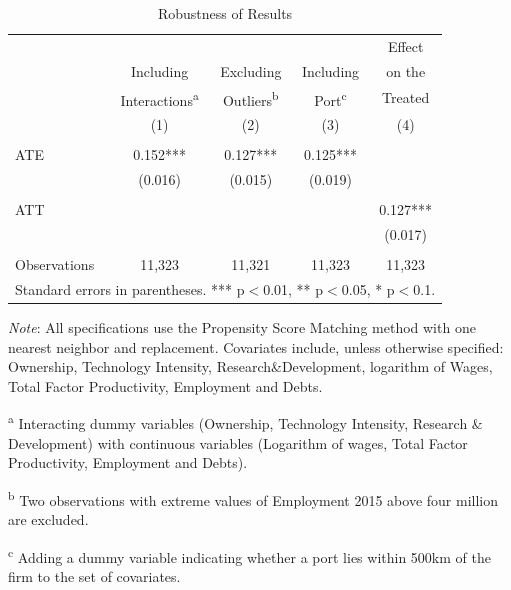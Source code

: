 \documentclass[a4paper,11pt]{scrartcl}
\begin{document}
\begin{table}[h]
  \centering
   \caption{Robustness of Results}
   \label{tab:robust}
\begin{threeparttable}
 
\begin{tabular}{lcccc} 
	\hline 
	\hline
 		& & & & Effect \\
 		& Including & Excluding & Including & on the\\
 		& Interactions\textsuperscript{a} & Outliers\textsuperscript{b} 
 		& Port\textsuperscript{c} & Treated \\
 		& (1) & (2) & (3) & (4) \\ 
 	\hline
 		&  &  &  &  \\
ATE 	& 0.152*** & 0.127*** & 0.125*** &  \\
 		& (0.016) & (0.015) & (0.019) &  \\
 		&  &  &  &  \\
ATT 	&  &  &  & 0.127*** \\
 		&  &  &  & (0.017) \\
 		&  &  &  &  \\
Observations & 11,323 & 11,321 & 11,323 & 11,323 \\ 
	\hline
	\hline
	\multicolumn{5}{c}{\footnotesize{Standard errors in parentheses. *** p$<$0.01, ** p$<$0.05, * p$<$0.1. }}
\end{tabular}

\begin{tablenotes}[flushleft]
     \footnotesize  
     
\item \textit{Note}: All specifications use the Propensity Score Matching method with one nearest neighbor and replacement. Covariates include, unless otherwise specified: Ownership, Technology Intensity, Research\&Development, logarithm of Wages, Total Factor Productivity, Employment and Debts. 

\item\textsuperscript{a} Interacting dummy variables (Ownership, Technology Intensity, Research \& Development) with continuous variables (Logarithm of wages, Total Factor Productivity, Employment and Debts).  

\item\textsuperscript{b} Two observations with extreme values of Employment 2015 above four million are excluded.
 
\item\textsuperscript{c} Adding a dummy variable indicating whether a port lies within 500km of the firm to the set of covariates.
\end{tablenotes}

\end{threeparttable}
\end{table}
\end{document}
